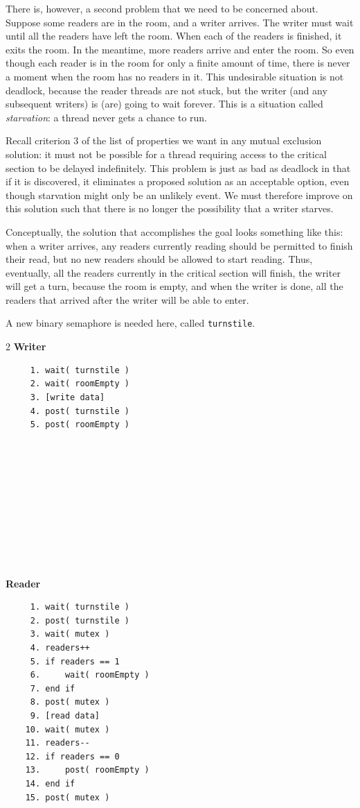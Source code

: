 There is, however, a second problem that we need to be concerned about. Suppose some readers are in the room, and a writer arrives. The writer must wait until all the readers have left the room. When each of the readers is finished, it exits the room. In the meantime, more readers arrive and enter the room. So even though each reader is in the room for only a finite amount of time, there is never a moment when the room has no readers in it. This undesirable situation is not deadlock, because the reader threads are not stuck, but the writer (and any subsequent writers) is (are) going to wait forever. This is a situation called \textit{starvation}: a thread never gets a chance to run.

Recall criterion 3 of the list of properties we want in any mutual exclusion solution: it must not be possible for a thread requiring access to the critical section to be delayed indefinitely. This problem is just as bad as deadlock in that if it is discovered, it eliminates a proposed solution as an acceptable option, even though starvation might only be an unlikely event. We must therefore improve on this solution such that there is no longer the possibility that a writer starves.

Conceptually, the solution that accomplishes the goal looks something like this: when a writer arrives, any readers currently reading should be permitted to finish their read, but no new readers should be allowed to start reading. Thus, eventually, all the readers currently in the critical section will finish, the writer will get a turn, because the room is empty, and when the writer is done, all the readers that arrived after the writer will be able to enter.

A new binary semaphore is needed here, called \texttt{turnstile}.

\begin{multicols}{2}
	\textbf{Writer}\vspace{-2em}
	\begin{verbatim}
	 1. wait( turnstile )
	 2. wait( roomEmpty )
	 3. [write data]
	 4. post( turnstile )
	 5. post( roomEmpty )
	 
	 
	 
	 
	 
	 
	 
	 
	 
	 
  \end{verbatim}
	\columnbreak
	\textbf{Reader}\vspace{-2em}
	\begin{verbatim}
	 1. wait( turnstile )
	 2. post( turnstile )
	 3. wait( mutex )
	 4. readers++
	 5. if readers == 1
	 6.     wait( roomEmpty )
	 7. end if
	 8. post( mutex )
	 9. [read data]
	10. wait( mutex )
	11. readers--
	12. if readers == 0
	13.     post( roomEmpty )
	14. end if
	15. post( mutex )
  \end{verbatim}
\end{multicols}
\vspace{-2em}

